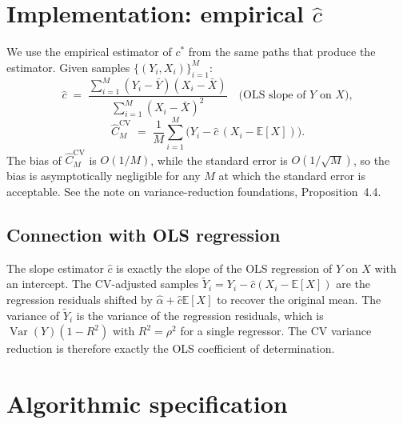 \documentclass[11pt,a4paper]{article}
\theoremstyle{plain}
\theoremstyle{definition}
\theoremstyle{remark}
\newcommand{\E}{\mathbb{E}}
\newcommand{\Var}{\operatorname{Var}}
\begin{document}
\section{Implementation: empirical \texorpdfstring{$\hat c$}{c-hat}}
\label{sec:empirical}

We use the empirical estimator of $c^*$ from the same paths that
produce the estimator. Given samples $\{(Y_i, X_i)\}_{i=1}^M$:
\begin{equation}
\hat c \;=\; \frac{\sum_{i=1}^M (Y_i - \bar Y)(X_i - \bar X)}
                  {\sum_{i=1}^M (X_i - \bar X)^2}
\quad\text{(OLS slope of $Y$ on $X$)},
\end{equation}
\begin{equation}
\hat C_M^{\mathrm{CV}} \;=\; \frac{1}{M} \sum_{i=1}^M
\bigl(Y_i - \hat c\,(X_i - \E[X])\bigr).
\end{equation}
The bias of $\hat C_M^{\mathrm{CV}}$ is $O(1/M)$, while the standard
error is $O(1/\sqrt M)$, so the bias is asymptotically negligible
for any $M$ at which the standard error is acceptable. See
the note on variance-reduction foundations, Proposition~4.4.

\subsection{Connection with OLS regression}

The slope estimator $\hat c$ is exactly the slope of the OLS
regression of $Y$ on $X$ with an intercept. The CV-adjusted samples
$\tilde Y_i = Y_i - \hat c (X_i - \E[X])$ are the regression residuals
shifted by $\hat\alpha + \hat c \E[X]$ to recover the original mean.
The variance of $\tilde Y_i$ is the variance of the regression
residuals, which is $\Var(Y)(1 - R^2)$ with $R^2 = \rho^2$ for a
single regressor. The CV variance reduction is therefore exactly
the OLS coefficient of determination.

\section{Algorithmic specification}
\label{sec:algorithm}
\end{document}
